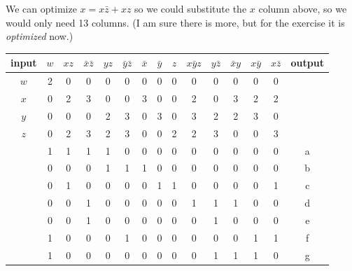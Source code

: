 \documentclass[10pt,a4paper]{scrartcl}
\begin{document}
We can optimize $x=x\bar z+xz$ so we could substitute the $x$ column above, so we would only need 13 columns. (I am sure there is more, but for the exercise it is \textit{optimized} now.)

\begin{tabular}{|c||c|c|c|c|c|c|c|c|c|c|c|c|c||c|}
  \hline
 input  & $w$ & $xz$ & $\bar x\bar z$ & $yz$ & $\bar y\bar z$ & $\bar x$ & $\bar y$ & $z$ & $x\bar yz$ & $y\bar z$ & $\bar xy$ & $x\bar y$ & $x\bar z$ & output \\ \hline\hline
  $w$   & 2   & 0    &      0         &  0   &      0         &    0     &   0      &  0  &     0      &     0     &    0      &   0       &    0      &        \\ \hline
  $x$   & 0   & 2    &      3         &  0   &      0         &    3     &   0      &  0  &     2      &     0     &    3      &   2       &    2      &        \\ \hline
  $y$   & 0   & 0    &      0         &  2   &      3         &    0     &   3      &  0  &     3      &     2     &    2      &   3       &    0      &        \\ \hline
  $z$   & 0   & 2    &      3         &  2   &      3         &    0     &   0      &  2  &     2      &     3     &    0      &   0       &    3      &        \\ \hline\hline
        & 1   & 1    &      1         &  1   &      0         &    0     &   0      &  0  &     0      &     0     &    0      &   0       &    0      &   a    \\ \hline
        & 0   & 0    &      0         &  1   &      1         &    1     &   0      &  0  &     0      &     0     &    0      &   0       &    0      &   b    \\ \hline
        & 0   & 1    &      0         &  0   &      0         &    0     &   1      &  1  &     0      &     0     &    0      &   0       &    1      &   c    \\ \hline
        & 0   & 0    &      1         &  0   &      0         &    0     &   0      &  0  &     1      &     1     &    1      &   0       &    0      &   d    \\ \hline
        & 0   & 0    &      1         &  0   &      0         &    0     &   0      &  0  &     0      &     1     &    0      &   0       &    0      &   e    \\ \hline
        & 1   & 0    &      0         &  0   &      1         &    0     &   0      &  0  &     0      &     0     &    0      &   1       &    1      &   f    \\ \hline
        & 1   & 0    &      0         &  0   &      0         &    0     &   0      &  0  &     0      &     1     &    1      &   1       &    0      &   g    \\ \hline
\end{tabular}

\FloatBarrier
\end{document}
